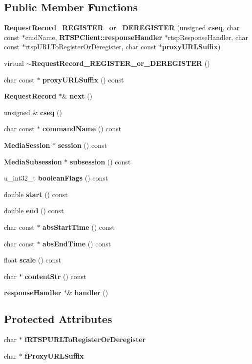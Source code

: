\subsection*{Public Member Functions}
\begin{DoxyCompactItemize}
\item 
{\bf Request\+Record\+\_\+\+R\+E\+G\+I\+S\+T\+E\+R\+\_\+or\+\_\+\+D\+E\+R\+E\+G\+I\+S\+T\+E\+R} (unsigned {\bf cseq}, char const $\ast$cmd\+Name, {\bf R\+T\+S\+P\+Client\+::response\+Handler} $\ast$rtsp\+Response\+Handler, char const $\ast$rtsp\+U\+R\+L\+To\+Register\+Or\+Deregister, char const $\ast${\bf proxy\+U\+R\+L\+Suffix})
\item 
virtual {\bf $\sim$\+Request\+Record\+\_\+\+R\+E\+G\+I\+S\+T\+E\+R\+\_\+or\+\_\+\+D\+E\+R\+E\+G\+I\+S\+T\+E\+R} ()
\item 
char const $\ast$ {\bf proxy\+U\+R\+L\+Suffix} () const 
\item 
{\bf Request\+Record} $\ast$\& {\bf next} ()
\item 
unsigned \& {\bf cseq} ()
\item 
char const $\ast$ {\bf command\+Name} () const 
\item 
{\bf Media\+Session} $\ast$ {\bf session} () const 
\item 
{\bf Media\+Subsession} $\ast$ {\bf subsession} () const 
\item 
u\+\_\+int32\+\_\+t {\bf boolean\+Flags} () const 
\item 
double {\bf start} () const 
\item 
double {\bf end} () const 
\item 
char const $\ast$ {\bf abs\+Start\+Time} () const 
\item 
char const $\ast$ {\bf abs\+End\+Time} () const 
\item 
float {\bf scale} () const 
\item 
char $\ast$ {\bf content\+Str} () const 
\item 
{\bf response\+Handler} $\ast$\& {\bf handler} ()
\end{DoxyCompactItemize}
\subsection*{Protected Attributes}
\begin{DoxyCompactItemize}
\item 
char $\ast$ {\bf f\+R\+T\+S\+P\+U\+R\+L\+To\+Register\+Or\+Deregister}
\item 
char $\ast$ {\bf f\+Proxy\+U\+R\+L\+Suffix}
\end{DoxyCompactItemize}


